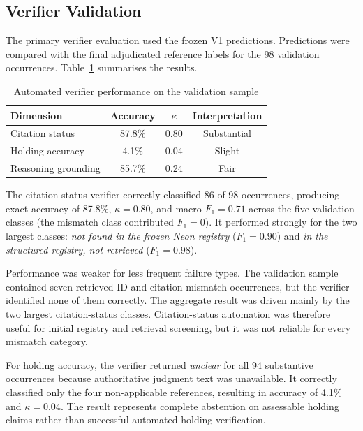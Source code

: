 \documentclass[conference]{IEEEtran}
\begin{document}
\subsection{Verifier Validation}

The primary verifier evaluation used the frozen V1 predictions. Predictions were compared with the final adjudicated reference labels for the 98 validation occurrences. Table~\ref{tab:validation} summarises the results.

\begin{table}[t]
\centering
\caption{Automated verifier performance on the validation sample}
\label{tab:validation}
\begin{tabular}{lccc}
\toprule
\textbf{Dimension} & \textbf{Accuracy} & \textbf{$\kappa$} & \textbf{Interpretation} \\
\midrule
Citation status & 87.8\% & 0.80 & Substantial \\
Holding accuracy & 4.1\% & 0.04 & Slight \\
Reasoning grounding & 85.7\% & 0.24 & Fair \\
\bottomrule
\end{tabular}
\end{table}

The citation-status verifier correctly classified 86 of 98 occurrences, producing exact accuracy of 87.8\%, $\kappa = 0.80$, and macro $F_1 = 0.71$ across the five validation classes (the mismatch class contributed $F_1 = 0$). It performed strongly for the two largest classes: \textit{not found in the frozen Neon registry} ($F_1 = 0.90$) and \textit{in the structured registry, not retrieved} ($F_1 = 0.98$).

Performance was weaker for less frequent failure types. The validation sample contained seven retrieved-ID and citation-mismatch occurrences, but the verifier identified none of them correctly. The aggregate result was driven mainly by the two largest citation-status classes. Citation-status automation was therefore useful for initial registry and retrieval screening, but it was not reliable for every mismatch category.

For holding accuracy, the verifier returned \textit{unclear} for all 94 substantive occurrences because authoritative judgment text was unavailable. It correctly classified only the four non-applicable references, resulting in accuracy of 4.1\% and $\kappa = 0.04$. The result represents complete abstention on assessable holding claims rather than successful automated holding verification.
\end{document}
